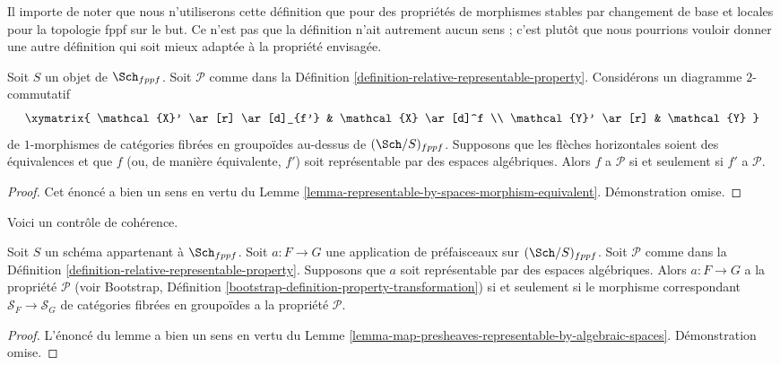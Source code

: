\noindent
Il importe de noter que nous n'utiliserons cette définition que pour des
propriétés de morphismes stables par changement de base et
locales pour la topologie fppf sur le but. Ce n'est
pas que la définition n'ait autrement aucun sens ; c'est plutôt
que nous pourrions vouloir donner une autre définition qui soit
mieux adaptée à la propriété envisagée.

\begin{lemma}
\label{lemma-property-morphism-equivalent}
Soit $S$ un objet de $\Sch_{fppf}$.
Soit $\mathcal{P}$ comme dans la
Définition \ref{definition-relative-representable-property}.
Considérons un diagramme $2$-commutatif
$$
\xymatrix{
\mathcal{X}' \ar[r] \ar[d]_{f'} & \mathcal{X} \ar[d]^f \\
\mathcal{Y}' \ar[r] & \mathcal{Y}
}
$$
de $1$-morphismes de catégories fibrées en groupoïdes au-dessus de
$(\Sch/S)_{fppf}$.
Supposons que les flèches horizontales soient des équivalences et que $f$
(ou, de manière équivalente, $f'$) soit représentable par des espaces algébriques.
Alors $f$ a $\mathcal{P}$ si et seulement si $f'$ a $\mathcal{P}$.
\end{lemma}

\begin{proof}
Cet énoncé a bien un sens en vertu du
Lemme \ref{lemma-representable-by-spaces-morphism-equivalent}.
Démonstration omise.
\end{proof}

\noindent
Voici un contrôle de cohérence.

\begin{lemma}
\label{lemma-map-presheaves-representable-by-spaces-transformation-property}
Soit $S$ un schéma appartenant à $\Sch_{fppf}$.
Soit $a : F \to G$ une application de préfaisceaux sur $(\Sch/S)_{fppf}$.
Soit $\mathcal{P}$ comme dans la
Définition \ref{definition-relative-representable-property}.
Supposons que $a$ soit représentable par des espaces algébriques.
Alors $a : F \to G$ a la propriété $\mathcal{P}$ (voir
Bootstrap, Définition \ref{bootstrap-definition-property-transformation})
si et seulement si le morphisme correspondant
$\mathcal{S}_F \to \mathcal{S}_G$ de catégories fibrées en groupoïdes
a la propriété $\mathcal{P}$.
\end{lemma}

\begin{proof}
L'énoncé du lemme a bien un sens en vertu du
Lemme \ref{lemma-map-presheaves-representable-by-algebraic-spaces}.
Démonstration omise.
\end{proof}

